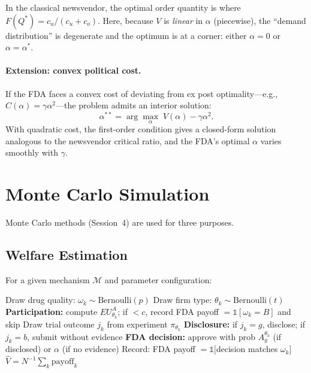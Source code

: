 \documentclass[12pt,a4paper]{article}
\begin{document}
In the classical newsvendor, the optimal order quantity is
where $F(Q^*) = c_u/(c_u + c_o)$. Here, because $V$ is
\emph{linear} in $\alpha$ (piecewise), the ``demand
distribution'' is degenerate and the optimum is at a
corner: either $\alpha = 0$ or $\alpha = \alpha^*$.

\paragraph{Extension: convex political cost.}
If the FDA faces a convex cost of deviating from ex post
optimality---e.g., $C(\alpha) = \gamma \alpha^2$---the
problem admits an interior solution:
\[
  \alpha^{**}
  = \arg\max_\alpha \; V(\alpha) - \gamma \alpha^2.
\]
With quadratic cost, the first-order condition gives a
closed-form solution analogous to the newsvendor critical
ratio, and the FDA's optimal $\alpha$ varies smoothly
with $\gamma$.


\section{Monte Carlo Simulation}
\label{sec:monte_carlo}

Monte Carlo methods (Session~4) are used for three purposes.

\subsection{Welfare Estimation}

For a given mechanism $\mathcal{M}$ and parameter
configuration:

\begin{algorithmic}[1]
  \STATE Draw drug quality:
    $\omega_k \sim \text{Bernoulli}(p)$
  \STATE Draw firm type:
    $\theta_k \sim \text{Bernoulli}(t)$
  \STATE \textbf{Participation:}
    compute $EU^A_{\theta_k}$; if $< c$, record
    FDA payoff $= \mathbb{1}[\omega_k = B]$ and skip
  \STATE Draw trial outcome $j_k$ from experiment
    $\pi_{\theta_k}$
  \STATE \textbf{Disclosure:} if $j_k = g$, disclose;
    if $j_k = b$, submit without evidence
  \STATE \textbf{FDA decision:} approve with prob
    $A_g^{\theta_k}$ (if disclosed) or $\alpha$
    (if no evidence)
  \STATE Record: FDA payoff $= \mathbb{1}[$decision
    matches $\omega_k]$
\ENDFOR
\STATE $\widehat{V} = N^{-1} \sum_k \text{payoff}_k$
\end{algorithmic}
\end{document}
